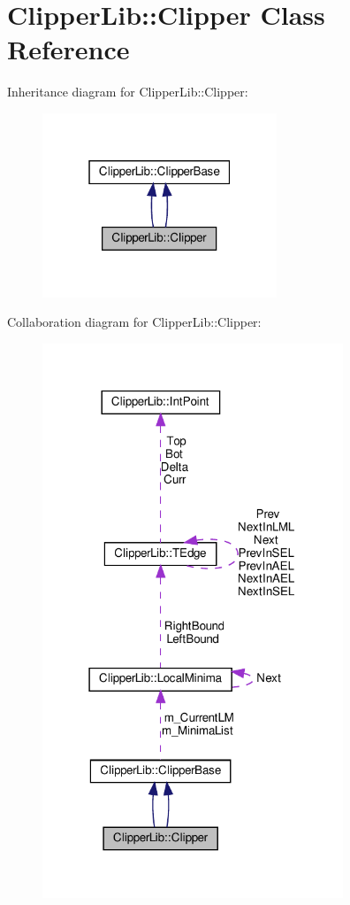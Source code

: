 \hypertarget{classClipperLib_1_1Clipper}{}\section{Clipper\+Lib\+:\+:Clipper Class Reference}
\label{classClipperLib_1_1Clipper}


Inheritance diagram for Clipper\+Lib\+:\+:Clipper\+:
\nopagebreak
\begin{figure}[H]
\begin{center}
\leavevmode
\includegraphics[width=199pt]{classClipperLib_1_1Clipper__inherit__graph}
\end{center}
\end{figure}


Collaboration diagram for Clipper\+Lib\+:\+:Clipper\+:
\nopagebreak
\begin{figure}[H]
\begin{center}
\leavevmode
\includegraphics[width=255pt]{classClipperLib_1_1Clipper__coll__graph}
\end{center}
\end{figure}
